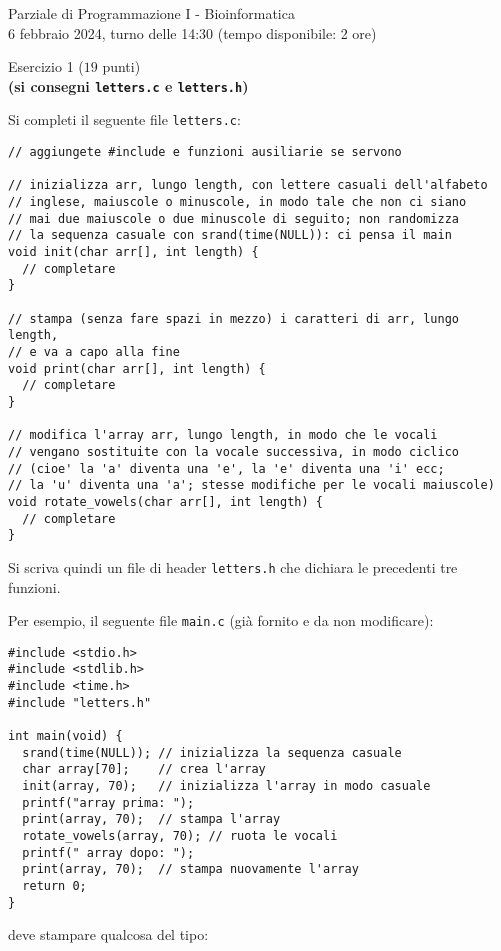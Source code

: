 \documentclass[12pt]{article}
\begin{document}
\begin{center}{\LARGE Parziale di Programmazione I - Bioinformatica}\\
  \large 6 febbraio 2024, turno delle 14:30 (tempo disponibile: 2 ore)
\end{center}

\vspace*{1ex}
\begin{center}{\Large Esercizio 1} ($19$ punti)\\
  \textbf{(si consegni \texttt{letters.c} e \texttt{letters.h})}
\end{center}

Si completi il seguente file \texttt{letters.c}:

\begin{center}
\begin{lstlisting}[language=myC]
// aggiungete #include e funzioni ausiliarie se servono

// inizializza arr, lungo length, con lettere casuali dell'alfabeto
// inglese, maiuscole o minuscole, in modo tale che non ci siano
// mai due maiuscole o due minuscole di seguito; non randomizza
// la sequenza casuale con srand(time(NULL)): ci pensa il main
void init(char arr[], int length) {
  // completare
}

// stampa (senza fare spazi in mezzo) i caratteri di arr, lungo length,
// e va a capo alla fine
void print(char arr[], int length) {
  // completare
}

// modifica l'array arr, lungo length, in modo che le vocali
// vengano sostituite con la vocale successiva, in modo ciclico
// (cioe' la 'a' diventa una 'e', la 'e' diventa una 'i' ecc;
// la 'u' diventa una 'a'; stesse modifiche per le vocali maiuscole)
void rotate_vowels(char arr[], int length) {
  // completare
}
\end{lstlisting}
\end{center}
%
Si scriva quindi un file di header \texttt{letters.h} che dichiara le precedenti tre funzioni.

Per esempio, il seguente file \texttt{main.c}
(gi\`a fornito e da non modificare):

\begin{center}
  \begin{lstlisting}[language=myC]
#include <stdio.h>
#include <stdlib.h>
#include <time.h>
#include "letters.h"

int main(void) {
  srand(time(NULL)); // inizializza la sequenza casuale
  char array[70];    // crea l'array
  init(array, 70);   // inizializza l'array in modo casuale
  printf("array prima: ");
  print(array, 70);  // stampa l'array
  rotate_vowels(array, 70); // ruota le vocali
  printf(" array dopo: ");
  print(array, 70);  // stampa nuovamente l'array
  return 0;
}
  \end{lstlisting}
\end{center}
deve stampare qualcosa del tipo:
\end{document}
